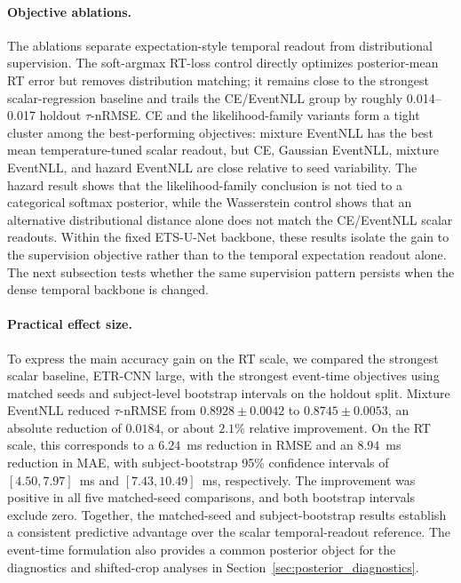 \documentclass[12pt]{article}
\begin{document}
\paragraph{Objective ablations.}
The ablations separate expectation-style temporal readout from distributional supervision. The soft-argmax RT-loss control directly optimizes posterior-mean RT error but removes distribution matching; it remains close to the strongest scalar-regression baseline and trails the CE/EventNLL group by roughly 0.014--0.017 holdout \(\tau\)-nRMSE. CE and the likelihood-family variants form a tight cluster among the best-performing objectives: mixture EventNLL has the best mean temperature-tuned scalar readout, but CE, Gaussian EventNLL, mixture EventNLL, and hazard EventNLL are close relative to seed variability. The hazard result shows that the likelihood-family conclusion is not tied to a categorical softmax posterior, while the Wasserstein control shows that an alternative distributional distance alone does not match the CE/EventNLL scalar readouts. Within the fixed ETS-U-Net backbone, these results isolate the gain to the supervision objective rather than to the temporal expectation readout alone. The next subsection tests whether the same supervision pattern persists when the dense temporal backbone is changed.

\paragraph{Practical effect size.}
To express the main accuracy gain on the RT scale, we compared the strongest scalar baseline, ETR-CNN large, with the strongest event-time objectives using matched seeds and subject-level bootstrap intervals on the holdout split. Mixture EventNLL reduced \(\tau\)-nRMSE from \(0.8928 \pm 0.0042\) to \(0.8745 \pm 0.0053\), an absolute reduction of \(0.0184\), or about \(2.1\%\) relative improvement. On the RT scale, this corresponds to a \(6.24\)~ms reduction in RMSE and an \(8.94\)~ms reduction in MAE, with subject-bootstrap 95\% confidence intervals of \([4.50, 7.97]\)~ms and \([7.43, 10.49]\)~ms, respectively. The improvement was positive in all five matched-seed comparisons, and both bootstrap intervals exclude zero. Together, the matched-seed and subject-bootstrap results establish a consistent predictive advantage over the scalar temporal-readout reference. The event-time formulation also provides a common posterior object for the diagnostics and shifted-crop analyses in Section~\ref{sec:posterior_diagnostics}.
\end{document}
